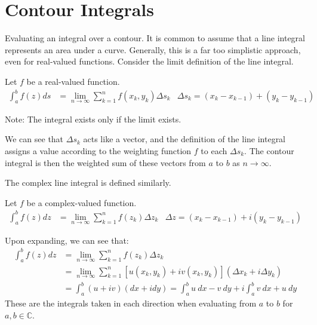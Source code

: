\documentclass[12pt, english]{book}
\begin{document}
	\section{Contour Integrals} \label{Contour Integrals Section - Complex}
	
	Evaluating an integral over a contour. It is common to assume that a line integral represents an area under a curve. Generally, this is a far too simplistic approach, even for real-valued functions. Consider the limit definition of the line integral.
	
	\begin{definition}
		\label{Line integral Definition - Complex}
		Let \(f\) be a real-valued function.
		\begin{align*}
			\int_{a}^{b} f(z) ds
			&= \lim_{n \rightarrow \infty} \sum_{k=1}^{n} f(x_k, y_k) \Delta s_k
				&\Delta s_k = (x_k - x_{k-1}) + (y_k - y_{k-1})
		\end{align*}
	\end{definition}

	Note: The integral exists only if the limit exists. 
	
	We can see that \(\Delta s_k\) acts like a vector, and the definition of the line integral assigns a value according to the weighting function \(f\) to each \(\Delta s_k\). The contour integral is then the weighted sum of these vectors from \(a\) to \(b\) as \(n \rightarrow \infty\).
	
	The complex line integral is defined similarly.
	
	\begin{definition}
		Let \(f\) be a complex-valued function.
		\begin{align*}
			\int_{a}^{b} f(z) dz 
			&= \lim_{n \rightarrow \infty} \sum_{k=1}^{n} f(z_k) \Delta z_k 
				& \Delta z = (x_k - x_{k-1}) + i(y_k - y_{k-1})
		\end{align*}
	\end{definition}

	Upon expanding, we can see that:
	\begin{align*}
		\int_{a}^{b} f(z) dz 
		&= \lim_{n \rightarrow \infty} \sum_{k=1}^{n} f(z_k) \Delta z_k  \\
		&= \lim_{n \rightarrow \infty} \sum_{k=1}^{n} [u(x_k, y_k) + iv(x_k, y_k)](\Delta x_k + i \Delta y_k) \\
		&= \int_{a}^{b} (u + iv)(dx + i dy) = \int_{a}^{b} u \ dx - v \ dy + i\int_{a}^{b} v \ dx + u \ dy
	\end{align*}
	These are the integrals taken in each direction when evaluating from \(a\) to \(b\) for \(a,b \in \mathbb{C}\).
	
\end{document}
